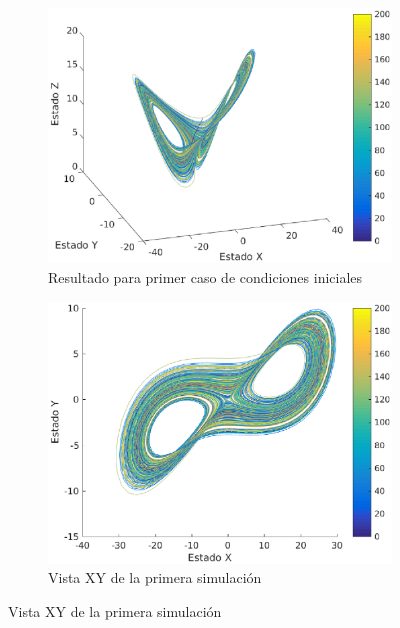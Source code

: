 \documentclass[12pt,letterpaper]{article}
\begin{document}
\begin{figure}
	\centering
	\begin{subfigure}[t]{0.36\textwidth}
		\includegraphics[width=\textwidth]{pictures/primera_simulacion}
		\caption{Resultado para primer caso de condiciones iniciales}
		\label{fig:simulacion1}
	\end{subfigure}
	\begin{subfigure}[t]{0.36\textwidth}
		\includegraphics[width=\textwidth]{pictures/primera_simulacion_xy}
		\caption{Vista XY de la primera simulación}
		\label{fig:simulacion1xy}

\end{subfigure}
\end{figure}
\end{document}
